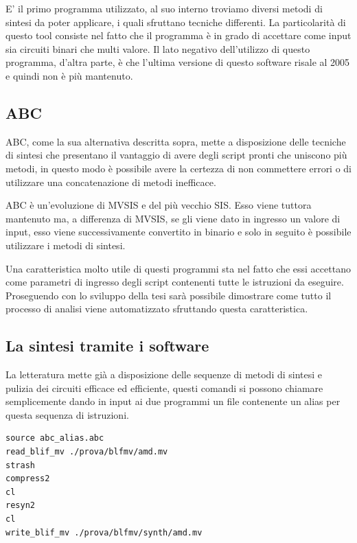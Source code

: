 \documentclass[italian,]{book}
\begin{document}
E' il primo programma utilizzato, al suo interno troviamo diversi metodi di sintesi da poter applicare, i quali sfruttano tecniche differenti. La particolarità di questo tool consiste nel fatto che il programma è in grado di accettare come input sia circuiti binari che multi valore. Il lato negativo dell'utilizzo di questo programma, d'altra parte, è che l'ultima versione di questo software risale al 2005 e quindi non è più mantenuto.

\hypertarget{abc-1}{%
\subsection{ABC}\label{abc-1}}

ABC, come la sua alternativa descritta sopra, mette a disposizione delle tecniche di sintesi che presentano il vantaggio di avere degli script pronti che uniscono più metodi, in questo modo è possibile avere la certezza di non commettere errori o di utilizzare una concatenazione di metodi inefficace.

ABC è un'evoluzione di MVSIS e del più vecchio SIS. Esso viene tuttora mantenuto ma, a differenza di MVSIS, se gli viene dato in ingresso un valore di input, esso viene successivamente convertito in binario e solo in seguito è possibile utilizzare i metodi di sintesi.

Una caratteristica molto utile di questi programmi sta nel fatto che essi accettano come parametri di ingresso degli script contenenti tutte le istruzioni da eseguire. Proseguendo con lo sviluppo della tesi sarà possibile dimostrare come tutto il processo di analisi viene automatizzato sfruttando questa caratteristica.

\newpage

\hypertarget{la-sintesi-tramite-i-software}{%
\subsection{La sintesi tramite i software}\label{la-sintesi-tramite-i-software}}

La letteratura mette già a disposizione delle sequenze di metodi di sintesi e pulizia dei circuiti efficace ed efficiente, questi comandi si possono chiamare semplicemente dando in input ai due programmi un file contenente un alias per questa sequenza di istruzioni.

\begin{verbatim}
source abc_alias.abc
read_blif_mv ./prova/blfmv/amd.mv
strash
compress2
cl
resyn2
cl
write_blif_mv ./prova/blfmv/synth/amd.mv
\end{verbatim}
\end{document}
